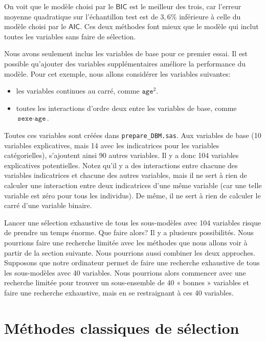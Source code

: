 \documentclass[
  11pt,
  letterpaper,
]{book}
\providecommand{\tightlist}{%
  \setlength{\itemsep}{0pt}\setlength{\parskip}{0pt}}
\theoremstyle{definition}
\theoremstyle{definition}
\theoremstyle{definition}
\theoremstyle{remark}
\begin{document}
On voit que le modèle choisi par le \(\mathsf{BIC}\) est le meilleur des trois, car l'erreur moyenne quadratique sur l'échantillon test est de \(3,6\)\% inférieure à celle du modèle choisi par le \(\mathsf{AIC}\). Ces deux méthodes font mieux que le modèle qui inclut toutes les variables sans faire de sélection.

Nous avons seulement inclus les variables de base pour ce premier essai. Il est possible qu'ajouter des variables supplémentaires améliore la performance du modèle. Pour cet exemple, nous allons considérer les variables suivantes:

\begin{itemize}
\tightlist
\item
  les variables continues au carré, comme \(\texttt{age}^2\).
\item
  toutes les interactions d'ordre deux entre les variables de base, comme \(\texttt{sexe}\cdot\texttt{age}\).
\end{itemize}

Toutes ces variables sont créées dans \texttt{prepare\_DBM.sas}. Aux variables de base (10 variables explicatives, mais 14 avec les indicatrices pour les variables catégorielles), s'ajoutent ainsi 90 autres variables. Il y a donc 104 variables explicatives potentielles. Notez qu'il y a des interactions entre chacune des variables indicatrices et chacune des autres variables, mais il ne sert à rien de calculer une interaction entre deux indicatrices d'une même variable (car une telle variable est zéro pour tous les individus). De même, il ne sert à rien de calculer le carré d'une variable binaire.

Lancer une sélection exhaustive de tous les sous-modèles avec 104 variables risque de prendre un temps énorme. Que faire alors? Il y a plusieurs possibilités. Nous pourrions faire une recherche limitée avec les méthodes que nous allons voir à partir de la section suivante. Nous pourrions aussi combiner les deux approches. Supposons que notre ordinateur permet de faire une recherche exhaustive de tous les sous-modèles avec 40 variables. Nous pourrions alors commencer avec une recherche limitée pour trouver un sous-ensemble de 40 « bonnes » variables et faire une recherche exhaustive, mais en se restraignant à ces 40 variables.

\hypertarget{muxe9thodes-classiques-de-suxe9lection}{%
\section{Méthodes classiques de sélection}\label{muxe9thodes-classiques-de-suxe9lection}}
\end{document}
